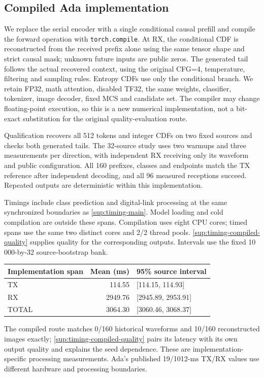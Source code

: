 \documentclass[10pt,letterpaper]{article}
\begin{document}
\subsection{Compiled Ada implementation}\label{sup:timing-compiled}
We replace the serial encoder with a single conditional causal prefill and compile the forward operation with \texttt{torch.compile}. At RX, the conditional CDF is reconstructed from the received prefix alone using the same tensor shape and strict causal mask; unknown future inputs are public zeros. The generated tail follows the actual recovered context, using the original CFG=4, temperature, filtering and sampling rules. Entropy CDFs use only the conditional branch. We retain FP32, math attention, disabled TF32, the same weights, classifier, tokenizer, image decoder, fixed MCS and candidate set. The compiler may change floating-point execution, so this is a new numerical implementation, not a bit-exact substitution for the original quality-evaluation route.

Qualification recovers all 512 tokens and integer CDFs on two fixed sources and checks both generated tails. The 32-source study uses two warmups and three measurements per direction, with independent RX receiving only its waveform and public configuration. All 160 prefixes, classes and endpoints match the TX reference after independent decoding, and all 96 measured receptions succeed. Repeated outputs are deterministic within this implementation.

Timings include class prediction and digital-link processing at the same synchronized boundaries as \ref{sup:timing-main}. Model loading and cold compilation are outside these spans. Compilation uses eight CPU cores; timed spans use the same two distinct cores and 2/2 thread pools. \ref{sup:timing-compiled-quality} supplies quality for the corresponding outputs. Intervals use the fixed 10\,000-by-32 source-bootstrap bank.

\begin{longtable}{@{}lrl@{}}\toprule
Implementation span & Mean (ms) & 95\% source interval\\\midrule\endhead
TX & 114.55 & [114.15, 114.93]\\
RX & 2949.76 & [2945.89, 2953.91]\\
TOTAL & 3064.30 & [3060.46, 3068.37]\\
\bottomrule\end{longtable}
The compiled route matches 0/160 historical waveforms and 10/160 reconstructed images exactly; \ref{sup:timing-compiled-quality} pairs its latency with its own output quality and explains the seed dependence. These are implementation-specific processing measurements. Ada's published 19/1012-ms TX/RX values use different hardware and processing boundaries.
\end{document}
